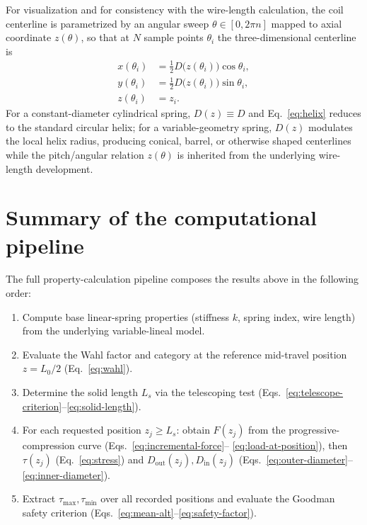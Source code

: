 \documentclass[11pt]{article}
\begin{document}
For visualization and for consistency with the wire-length calculation,
the coil centerline is parametrized by an angular sweep
$\theta \in [0, 2\pi n]$ mapped to axial coordinate $z(\theta)$, so that
at $N$ sample points $\theta_i$ the three-dimensional centerline is
\begin{equation}
\begin{aligned}
x(\theta_i) &= \tfrac12 D\big(z(\theta_i)\big)\cos\theta_i, \\
y(\theta_i) &= \tfrac12 D\big(z(\theta_i)\big)\sin\theta_i, \\
z(\theta_i) &= z_i .
\end{aligned}
\label{eq:helix}
\end{equation}
For a constant-diameter cylindrical spring, $D(z)\equiv D$ and
Eq.~\eqref{eq:helix} reduces to the standard circular helix; for a
variable-geometry spring, $D(z)$ modulates the local helix radius,
producing conical, barrel, or otherwise shaped centerlines while the
pitch/angular relation $z(\theta)$ is inherited from the underlying
wire-length development.

\section{Summary of the computational pipeline}

The full property-calculation pipeline composes the results above in the
following order:
\begin{enumerate}
\item Compute base linear-spring properties (stiffness $k$, spring
index, wire length) from the underlying variable-lineal model.
\item Evaluate the Wahl factor and category at the reference mid-travel
position $z = L_0/2$ (Eq.~\eqref{eq:wahl}).
\item Determine the solid length $L_s$ via the telescoping test
(Eqs.~\eqref{eq:telescope-criterion}--\eqref{eq:solid-length}).
\item For each requested position $z_j \ge L_s$: obtain $F(z_j)$ from
the progressive-compression curve (Eqs.~\eqref{eq:incremental-force}--
\eqref{eq:load-at-position}), then $\tau(z_j)$
(Eq.~\eqref{eq:stress}) and $D_{\mathrm{out}}(z_j),D_{\mathrm{in}}(z_j)$
(Eqs.~\eqref{eq:outer-diameter}--\eqref{eq:inner-diameter}).
\item Extract $\tau_{\max},\tau_{\min}$ over all recorded positions and
evaluate the Goodman safety criterion
(Eqs.~\eqref{eq:mean-alt}--\eqref{eq:safety-factor}).
\end{enumerate}
\end{document}
